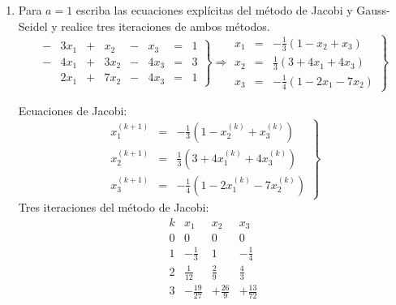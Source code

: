\documentclass[12pt]{article}
\begin{document}
\begin{ejercicio}
\begin{enumerate}
        \item Para $a = 1$ escriba las ecuaciones explícitas del método de Jacobi y Gauss-Seidel y realice tres iteraciones de ambos métodos.\\
        \begin{equation*}
            \left. \begin{array}{rrrrrrrr}
                -&3x_1&+&x_2&-&x_3 &=& 1 \\
                -&4x_1&+&3x_2&-&4x_3&=&3 \\
                &2x_1&+&7x_2&-&4x_3 &=& 1
            \end{array}\right\} \Longrightarrow
            \left. \begin{array}{rcl}
                x_1 &=& -\frac{1}{3}(1-x_2+x_3) \\
                x_2 &=& \frac{1}{3}(3+4x_1+4x_3) \\
                x_3 &=& -\frac{1}{4}(1-2x_1-7x_2)
            \end{array}\right\}
        \end{equation*}

        Ecuaciones de Jacobi:
        \begin{equation*}
            \left. \begin{array}{rcl}
                x_1^{(k+1)} &=& -\frac{1}{3}(1-x_2^{(k)}+x_3^{(k)}) \\
                x_2^{(k+1)} &=& \frac{1}{3}(3+4x_1^{(k)}+4x_3^{(k)}) \\
                x_3^{(k+1)} &=& -\frac{1}{4}(1-2x_1^{(k)}-7x_2^{(k)})
            \end{array}\right\}
        \end{equation*}
        Tres iteraciones del método de Jacobi:
        \begin{equation*}
            \begin{array}{c|ccc}
                k & x_1 & x_2 & x_3 \\ \hline
                0 & 0 & 0 & 0 \\
                1 & -\frac{1}{3} & 1 & -\frac{1}{4} \\
                2 & \frac{1}{12} & \frac{2}{9} & \frac{4}{3} \\
                3 & -\frac{19}{27} &+\frac{26}{9}& +\frac{13}{72}
            \end{array}
        \end{equation*}


\end{enumerate}
\end{ejercicio}
\end{document}
